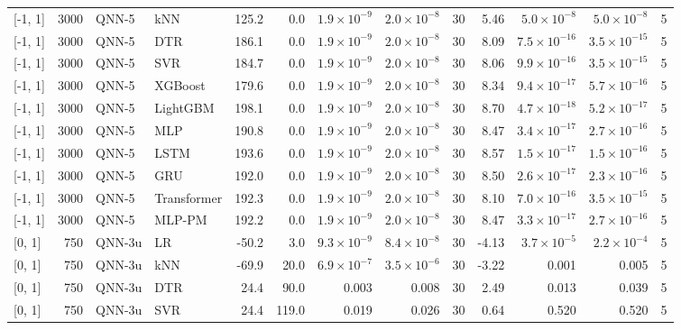 \begin{longtable}{lrllrrrrrrrrr}
{[-1, 1]} & 3000 & QNN-5 & kNN & 125.2 & 0.0 & $1.9 \times 10^{-9}$ & $2.0 \times 10^{-8}$ & 30 & 5.46 & $5.0 \times 10^{-8}$ & $5.0 \times 10^{-8}$ & 5 \\
{[-1, 1]} & 3000 & QNN-5 & DTR & 186.1 & 0.0 & $1.9 \times 10^{-9}$ & $2.0 \times 10^{-8}$ & 30 & 8.09 & $7.5 \times 10^{-16}$ & $3.5 \times 10^{-15}$ & 5 \\
{[-1, 1]} & 3000 & QNN-5 & SVR & 184.7 & 0.0 & $1.9 \times 10^{-9}$ & $2.0 \times 10^{-8}$ & 30 & 8.06 & $9.9 \times 10^{-16}$ & $3.5 \times 10^{-15}$ & 5 \\
{[-1, 1]} & 3000 & QNN-5 & XGBoost & 179.6 & 0.0 & $1.9 \times 10^{-9}$ & $2.0 \times 10^{-8}$ & 30 & 8.34 & $9.4 \times 10^{-17}$ & $5.7 \times 10^{-16}$ & 5 \\
{[-1, 1]} & 3000 & QNN-5 & LightGBM & 198.1 & 0.0 & $1.9 \times 10^{-9}$ & $2.0 \times 10^{-8}$ & 30 & 8.70 & $4.7 \times 10^{-18}$ & $5.2 \times 10^{-17}$ & 5 \\
{[-1, 1]} & 3000 & QNN-5 & MLP & 190.8 & 0.0 & $1.9 \times 10^{-9}$ & $2.0 \times 10^{-8}$ & 30 & 8.47 & $3.4 \times 10^{-17}$ & $2.7 \times 10^{-16}$ & 5 \\
{[-1, 1]} & 3000 & QNN-5 & LSTM & 193.6 & 0.0 & $1.9 \times 10^{-9}$ & $2.0 \times 10^{-8}$ & 30 & 8.57 & $1.5 \times 10^{-17}$ & $1.5 \times 10^{-16}$ & 5 \\
{[-1, 1]} & 3000 & QNN-5 & GRU & 192.0 & 0.0 & $1.9 \times 10^{-9}$ & $2.0 \times 10^{-8}$ & 30 & 8.50 & $2.6 \times 10^{-17}$ & $2.3 \times 10^{-16}$ & 5 \\
{[-1, 1]} & 3000 & QNN-5 & Transformer & 192.3 & 0.0 & $1.9 \times 10^{-9}$ & $2.0 \times 10^{-8}$ & 30 & 8.10 & $7.0 \times 10^{-16}$ & $3.5 \times 10^{-15}$ & 5 \\
{[-1, 1]} & 3000 & QNN-5 & MLP-PM & 192.2 & 0.0 & $1.9 \times 10^{-9}$ & $2.0 \times 10^{-8}$ & 30 & 8.47 & $3.3 \times 10^{-17}$ & $2.7 \times 10^{-16}$ & 5 \\
\midrule
{[0, 1]} & 750 & QNN-3u & LR & -50.2 & 3.0 & $9.3 \times 10^{-9}$ & $8.4 \times 10^{-8}$ & 30 & -4.13 & $3.7 \times 10^{-5}$ & $2.2 \times 10^{-4}$ & 5 \\
{[0, 1]} & 750 & QNN-3u & kNN & -69.9 & 20.0 & $6.9 \times 10^{-7}$ & $3.5 \times 10^{-6}$ & 30 & -3.22 & 0.001 & 0.005 & 5 \\
{[0, 1]} & 750 & QNN-3u & DTR & 24.4 & 90.0 & 0.003 & 0.008 & 30 & 2.49 & 0.013 & 0.039 & 5 \\
{[0, 1]} & 750 & QNN-3u & SVR & 24.4 & 119.0 & 0.019 & 0.026 & 30 & 0.64 & 0.520 & 0.520 & 5 \\

\end{longtable}
